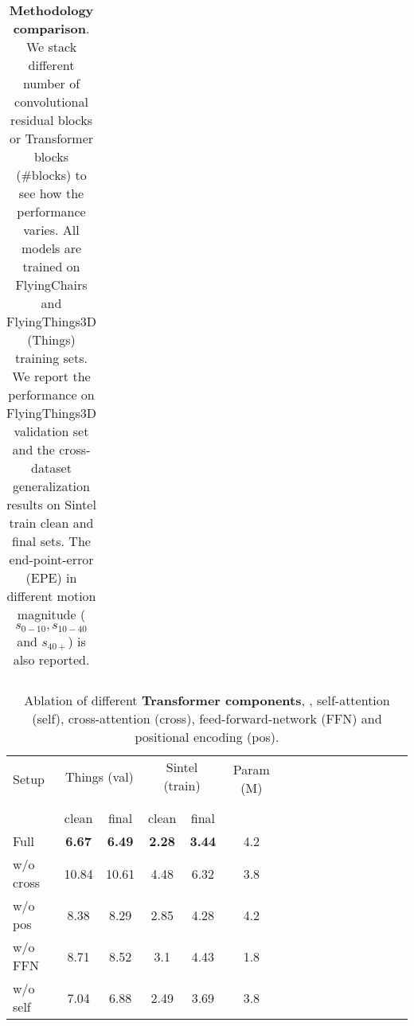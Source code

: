 \documentclass[10pt,twocolumn,letterpaper]{article}
\begin{document}
\begin{table*}[t]
\begin{tabular}{lcccccccccccccccccc}
    \bottomrule
    \end{tabular}
    \vspace{-5pt}
    \caption{\textbf{Methodology comparison}. We stack different number of convolutional residual blocks or Transformer blocks (\#blocks) to see how the performance varies. All models are trained on FlyingChairs and FlyingThings3D (Things) training sets. We report the performance on FlyingThings3D validation set and the cross-dataset generalization results on Sintel train clean and final sets. The end-point-error (EPE) in different motion magnitude ($s_{0-10}, s_{10-40}$ and $s_{40+}$) is also reported.
    }
    \label{tab:conv_vs_softmax}
    \vspace{-6pt}
\end{table*}




\begin{table}[t]
    \centering
    \setlength{\tabcolsep}{3.pt} %
    \begin{tabular}{lccccccccccccccc}
    \toprule
    
    \multirow{2}{*}[-2pt]{Setup} & \multicolumn{2}{c}{Things (val)} & \multicolumn{2}{c}{Sintel (train)} &  \multirow{2}{*}[-2pt]{Param (M)} \\
    \addlinespace[-12pt] \\
    \cmidrule(lr){2-3} \cmidrule(lr){4-5}
    \addlinespace[-12pt] \\
    & clean & final & clean & final & \\
    
 
    \midrule
    
    Full & \textbf{6.67} & \textbf{6.49} & \textbf{2.28} & \textbf{3.44} & 4.2 \\
    
    w/o cross & 10.84 & 10.61 & 4.48 & 6.32 & 3.8  \\
    w/o pos & 8.38 & 8.29 & 2.85 & 4.28 & 4.2 \\
    w/o FFN & 8.71 & 8.52 & 3.1 & 4.43 & 1.8 & \\
    w/o self & 7.04 & 6.88 & 2.49 & 3.69 & 3.8 \\
    
    
    \bottomrule
    \end{tabular}
    \vspace{-5pt}
    \caption{Ablation of different \textbf{Transformer components}, \ie, self-attention (self), cross-attention (cross), feed-forward-network (FFN) and positional encoding (pos).
    }
    \label{tab:ablation}
    \vspace{-6pt}
    
    
\end{table}
\end{document}
